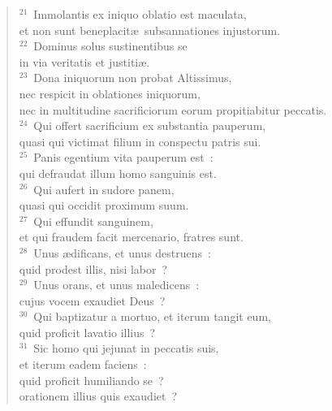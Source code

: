 \begin{verse}${}^{21}$~Immolantis ex iniquo oblatio est maculata,\\ et non sunt beneplacit\ae\ subsannationes injustorum.\\
${}^{22}$~Dominus solus sustinentibus se\\ in via veritatis et justiti\ae .\\
${}^{23}$~Dona iniquorum non probat Altissimus,\\ nec respicit in oblationes iniquorum,\\ nec in multitudine sacrificiorum eorum propitiabitur peccatis.\\
${}^{24}$~Qui offert sacrificium ex substantia pauperum,\\ quasi qui victimat filium in conspectu patris sui.\\
${}^{25}$~Panis egentium vita pauperum est~:\\ qui defraudat illum homo sanguinis est.\\
${}^{26}$~Qui aufert in sudore panem,\\ quasi qui occidit proximum suum.\\
${}^{27}$~Qui effundit sanguinem,\\ et qui fraudem facit mercenario, fratres sunt.\\
${}^{28}$~Unus \ae dificans, et unus destruens~:\\ quid prodest illis, nisi labor~?\\
${}^{29}$~Unus orans, et unus maledicens~:\\ cujus vocem exaudiet Deus~?\\
${}^{30}$~Qui baptizatur a mortuo, et iterum tangit eum,\\ quid proficit lavatio illius~?\\
${}^{31}$~Sic homo qui jejunat in peccatis suis,\\ et iterum eadem faciens~:\\ quid proficit humiliando se~?\\ orationem illius quis exaudiet~?\end{verse}


